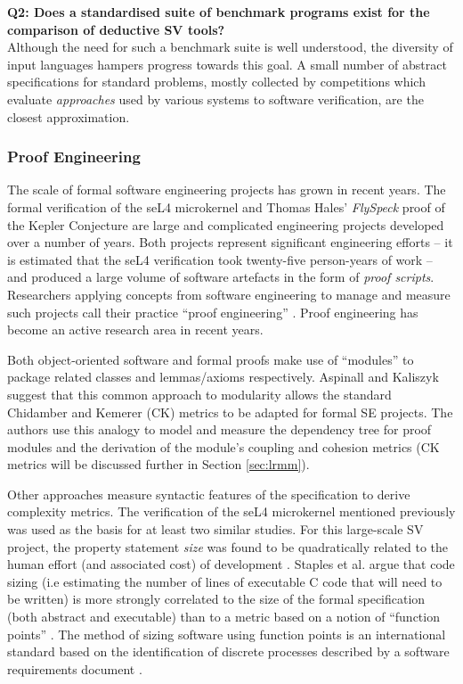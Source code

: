 \textbf{Q2: Does a standardised suite of benchmark programs exist for the comparison of deductive SV tools?} \\
Although the need for such a benchmark suite is well understood, the diversity of input languages hampers progress towards this goal. 
A small number of abstract specifications for standard problems, mostly collected by competitions which evaluate \textit{approaches} used by various systems to software verification, are the closest approximation.  

\subsubsection{Proof Engineering}
\label{sub:lrsvmmpe}

The scale of formal software engineering projects has grown in recent years. The formal verification of the seL4 microkernel \cite{Klein:2014:CFV} and Thomas Hales' \textit{FlySpeck} proof of the Kepler Conjecture \cite{hales-kepler} are large and complicated engineering projects developed over a number of years. Both projects represent significant engineering efforts -- it is estimated that the seL4 verification took twenty-five person-years of work -- and produced a large volume of software artefacts in the form of \textit{proof scripts}. Researchers applying concepts from software engineering to manage and measure such projects call their practice ``proof engineering'' \cite{Klein2014}. Proof engineering has become an active research area in recent years. 

Both object-oriented software and formal proofs make use of ``modules'' to package related classes and lemmas/axioms respectively. Aspinall and Kaliszyk \cite{Aspinall2016} suggest that this common approach to modularity allows the standard Chidamber and Kemerer \cite{CandK} (CK) metrics to be adapted for formal SE projects. The authors use this analogy to model and measure the dependency tree for proof modules and the derivation of the module's coupling and cohesion metrics (CK metrics will be discussed further in Section \ref{sec:lrmm}).

Other approaches measure syntactic features of the specification to derive complexity metrics. The verification of the seL4 microkernel mentioned previously was used as the basis for at least two similar studies. For this large-scale SV project, the property statement \textit{size} was found to be quadratically related to the human effort (and associated cost) of development \cite{CostIndicator}. Staples et al. argue that code sizing (i.e estimating the number of lines of executable C code that will need to be written) is more strongly correlated to the size of the formal specification (both abstract and executable) than to a metric based on a notion of ``function points'' \cite{Staples:2013}. The method of sizing software using function points is an international standard based on the identification of discrete processes described by a software requirements document \cite{CFP}.
   
